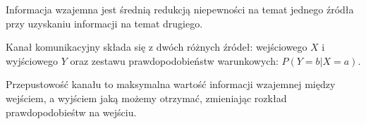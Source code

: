 Informacja wzajemna jest średnią redukcją niepewności na temat jednego źródła przy uzyskaniu informacji na temat drugiego.

Kanał komunikacyjny składa się z dwóch różnych źródeł: wejściowego $ X $ i wyjściowego $ Y $ oraz zestawu prawdopodobieństw warunkowych: $ P(Y = b| X = a) $.

Przepustowość kanału to maksymalna wartość informacji wzajemnej między wejściem, a wyjściem jaką możemy otrzymać, zmieniając rozkład prawdopodobieśtw na wejściu.